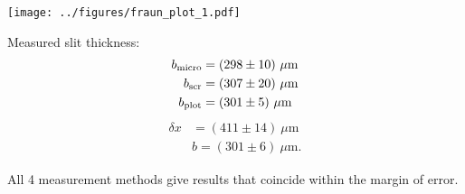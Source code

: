         




\begin{minipage}{0.48\textwidth}
        \hspace{-1cm}
        \texttt{[image: ../figures/fraun\_plot\_1.pdf]}
\end{minipage}
\hfill
\begin{minipage}{0.48\textwidth}
    Measured slit thickness:
    \begin{align*}
        b_{\text{micro}} &= (298 \pm 10) \ \mu\text{m} \\
        b_{\text{scr}} &= (307 \pm 20) \ \mu\text{m} \\
        \vspace{3mm}
        b_{\text{plot}} &= (301 \pm 5) \ \mu\text{m} \\
    \end{align*}
    \begin{align*}
            \delta x &= (411 \pm 14) \ \mu\text{m} \\
            &\boxed{b = (301 \pm 6) \ \mu\text{m}}.
    \end{align*}
    

    All 4 measurement methods give results that coincide within the margin of error.
\end{minipage}
